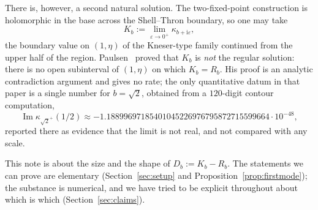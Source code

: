 \documentclass[11pt,a4paper]{article}
\theoremstyle{definition}
\newcommand{\Rr}{R}
\newcommand{\Kk}{K}
\newcommand{\ii}{\mathrm{i}}
\begin{document}
There is, however, a second natural solution.  The two-fixed-point construction
is holomorphic in the base across the Shell--Thron boundary, so one may take
\begin{equation}\label{eq:K}
  \Kk_b:=\lim_{\varepsilon\to0^{+}}\kappa_{b+\ii\varepsilon},
\end{equation}
the boundary value on $(1,\eta)$ of the Kneser-type family continued from the
upper half of the region.  Paulsen~\cite{Paulsen2019} proved that $\Kk_b$ is
\emph{not} the regular solution: there is no open subinterval of $(1,\eta)$ on
which $\Kk_b=\Rr_b$.  His proof is an analytic contradiction argument and gives
no rate; the only quantitative datum in that paper is a single number for
$b=\sqrt2$, obtained from a $120$-digit contour computation,
\begin{equation}\label{eq:paulsen}
  \operatorname{Im}\kappa_{\sqrt2^{+}}(1/2)
  \approx -1.18899697185401045226976795872715599664\cdot10^{-48},
\end{equation}
reported there as evidence that the limit is not real, and not compared with
any scale.

This note is about the size and the shape of $D_b:=\Kk_b-\Rr_b$.  The
statements we can prove are elementary (Section~\ref{sec:setup} and
Proposition~\ref{prop:firstmode}); the substance is numerical, and we have tried
to be explicit throughout about which is which (Section~\ref{sec:claims}).
\end{document}
